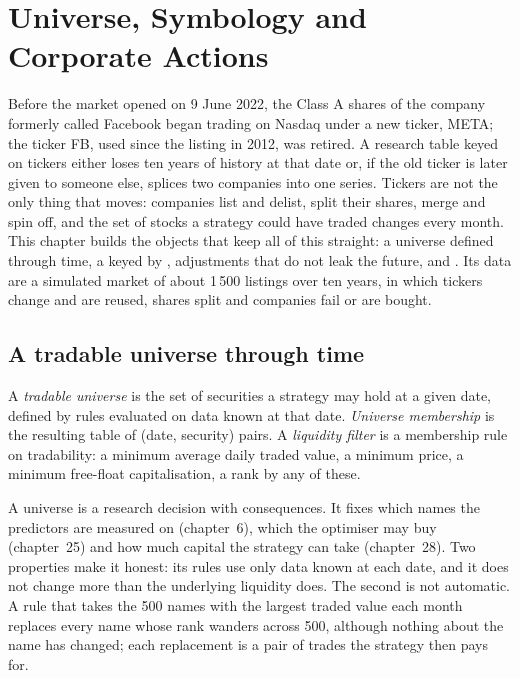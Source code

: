 \chapter{Universe, Symbology and Corporate Actions}\label{ch:rs:universe-symbology-and-corporate-actions}

Before the market opened on 9 June 2022, the Class A shares of the company formerly called Facebook began trading on
Nasdaq under a new ticker, META; the ticker FB, used since the listing in 2012, was retired. A research table keyed on
tickers either loses ten years of history at that date or, if the old ticker is later given to someone else, splices two
companies into one series. Tickers are not the only thing that moves: companies list and delist, split their shares, merge
and spin off, and the set of stocks a strategy could have traded changes every month. This chapter builds the objects that
keep all of this straight: a universe defined through time, a  keyed by , adjustments
that do not leak the future, and . Its data are a simulated market of about 1\,500 listings over ten years,
in which tickers change and are reused, shares split and companies fail or are bought.

\section{A tradable universe through time}

\begin{definition}\label{def:rs:universe-symbology-and-corporate-actions:universe}
A \emph{tradable universe} is the set of securities a strategy may hold at a given date, defined by
rules evaluated on data known at that date. \emph{Universe membership} is the resulting table of
(date, security) pairs. A \emph{liquidity filter} is a membership rule on tradability: a minimum
average daily traded value, a minimum price, a minimum free-float capitalisation, a rank by any of these.
\end{definition}

A universe is a research decision with consequences. It fixes which names the predictors are measured on (chapter~6), which
the optimiser may buy (chapter~25) and how much capital the strategy can take (chapter~28). Two properties make it honest:
its rules use only data known at each date, and it does not change more than the underlying liquidity does. The second is
not automatic. A rule that takes the 500 names with the largest traded value each month replaces every name whose rank
wanders across 500, although nothing about the name has changed; each replacement is a pair of trades the strategy then
pays for.

